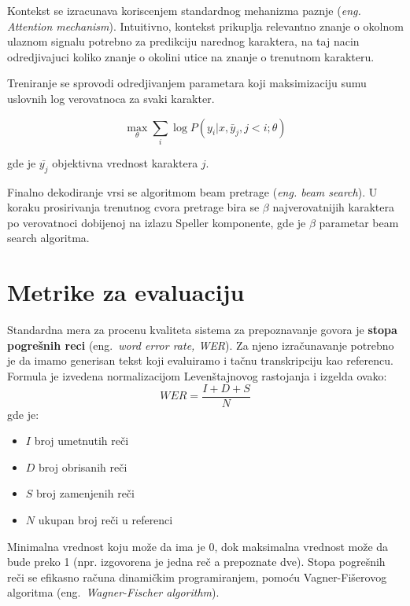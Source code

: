 \documentclass[a4paper]{article}
\begin{document}
\bigskip

Kontekst se izracunava koriscenjem standardnog mehanizma paznje (\textit{eng. Attention mechanism}).  Intuitivno, kontekst prikuplja relevantno znanje o okolnom ulaznom signalu potrebno za predikciju narednog karaktera,  na taj nacin odredjivajuci koliko znanje o okolini utice na znanje o trenutnom karakteru.

Treniranje se sprovodi odredjivanjem parametara koji maksimizaciju sumu uslovnih log verovatnoca za svaki karakter.

 \begin{equation}
\label{eq:max}
\max_{\theta} \sum_i \log P(y_i | x,  \bar{y}_j,  j < i; \theta)
\end{equation}

gde je $\bar{y_j}$ objektivna vrednost karaktera $j$.

Finalno dekodiranje vrsi se algoritmom beam pretrage (\textit{eng.  beam search}).  U koraku prosirivanja trenutnog cvora pretrage bira se $\beta$ najverovatnijih karaktera po verovatnoci dobijenoj na izlazu Speller komponente,  gde je $\beta$ parametar beam search algoritma.

\section{Metrike za evaluaciju}
Standardna mera za procenu kvaliteta sistema za prepoznavanje govora je \textbf{stopa pogrešnih reci} (eng.~{\em word error rate, WER}).
Za njeno izračunavanje potrebno je da imamo generisan tekst koji evaluiramo i tačnu transkripciju kao referencu.
Formula je izvedena normalizacijom Levenštajnovog rastojanja i izgelda ovako:
\begin{equation*}
  WER = \frac{I + D + S}{N}
\end{equation*}
gde je:
\begin{itemize}
  \item $I$ broj umetnutih reči
  \item $D$ broj obrisanih reči
  \item $S$ broj zamenjenih reči
  \item $N$ ukupan broj reči u referenci
\end{itemize}
Minimalna vrednost koju može da ima je 0, dok maksimalna vrednost može da bude preko 1 (npr. izgovorena je jedna reč a prepoznate dve).
Stopa pogrešnih reči se efikasno računa dinamičkim programiranjem, pomoću Vagner-Fišerovog algoritma (eng.~{\em Wagner-Fischer algorithm}). %
\end{document}
